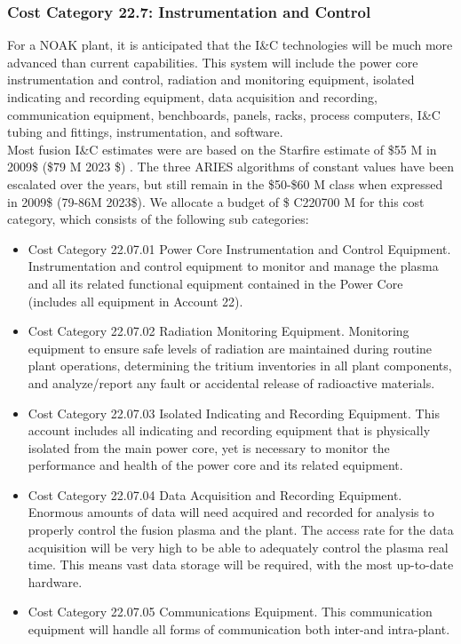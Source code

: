 \subsubsection{Cost Category 22.7: Instrumentation and Control }

For a NOAK plant, it is anticipated that the I\&C technologies will be much more advanced than current  capabilities. This system will include the power core instrumentation and control, radiation and  monitoring equipment, isolated indicating and recording equipment, data acquisition and  recording, communication equipment, benchboards, panels, racks, process computers, I\&C tubing and fittings, instrumentation, and software.\\

Most fusion I\&C estimates were are based on the Starfire  estimate of \$55 M in 2009\$ (\$79 M 2023 \$) . The three ARIES algorithms of constant values have been  escalated over the years, but still remain in the \$50-\$60 M class when expressed in 2009\$ (79-86M 2023\$).  We allocate a budget of \$ C220700 M for this cost category, which consists of the following sub categories:

\begin{itemize}
\item Cost Category 22.07.01 Power Core Instrumentation and Control Equipment. Instrumentation and control equipment to monitor and manage the plasma and all  its related functional equipment contained in the Power Core (includes all equipment in Account 22).

\item Cost Category 22.07.02 Radiation Monitoring Equipment. Monitoring equipment to ensure safe levels of radiation are maintained  during routine plant operations, determining the tritium inventories in all plant components, and  analyze/report any fault or accidental release of radioactive materials. 

\item Cost Category 22.07.03 Isolated Indicating and Recording Equipment. This account includes all  indicating and recording equipment that is physically isolated from the main power core, yet is  necessary to monitor the performance and health of the power core and its related equipment. 

\item Cost Category 22.07.04 Data Acquisition and Recording Equipment. Enormous amounts of data will need acquired and recorded  for analysis to properly control the fusion plasma and the plant. The access rate for the data  acquisition will be very high to be able to adequately control the plasma real time. This means vast data storage will be required, with the most up-to-date hardware.

\item Cost Category 22.07.05 Communications Equipment. This communication equipment will handle  all forms of communication both inter-and intra-plant. 

\end{itemize}